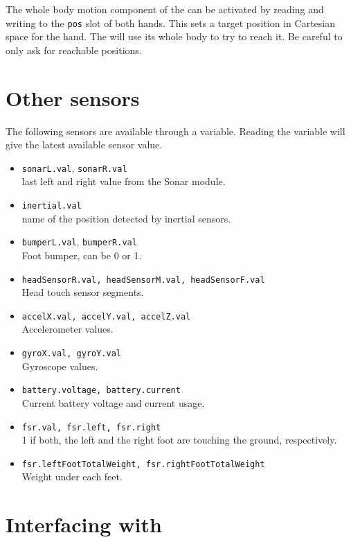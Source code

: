 The whole body motion component of the \naoqi can be activated by reading and
writing to the \lstinline|pos| slot of both hands. This sets a target
position in Cartesian space for the hand. The \naoqi will use its whole body
to try to reach it. Be careful to only ask for reachable positions.

\section{Other sensors}

The following sensors are available through a \us variable.
Reading the variable will give the latest available sensor value.

\begin{itemize}
\item \lstinline|sonarL.val|, \lstinline|sonarR.val| \\
    last left and right value from the Sonar module.
\item \lstinline|inertial.val| \\
    name of the position detected by inertial sensors.
\item \lstinline|bumperL.val|, \lstinline|bumperR.val| \\
    Foot bumper, can be 0 or 1.
\item \lstinline|headSensorR.val, headSensorM.val, headSensorF.val| \\
    Head touch sensor segments.
\item \lstinline|accelX.val, accelY.val, accelZ.val| \\
    Accelerometer values.
\item \lstinline|gyroX.val, gyroY.val| \\
    Gyroscope values.
\item \lstinline|battery.voltage, battery.current| \\
    Current battery voltage and current usage.
\item \lstinline|fsr.val, fsr.left, fsr.right| \\
    1 if both, the left and the right foot are touching the ground, respectively.
\item \lstinline|fsr.leftFootTotalWeight, fsr.rightFootTotalWeight| \\
    Weight under each feet.
\end{itemize}

\section{Interfacing with \naoqi}


